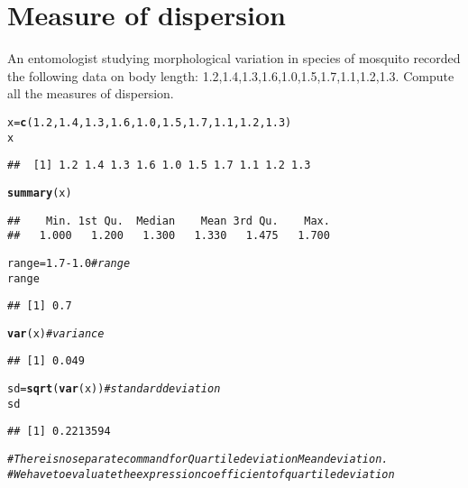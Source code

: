 \documentclass{article}\usepackage[]{graphicx}\usepackage[]{xcolor}
\makeatletter
\newcommand{\hlnum}[1]{\textcolor[rgb]{0.686,0.059,0.569}{#1}}%
\newcommand{\hlcom}[1]{\textcolor[rgb]{0.678,0.584,0.686}{\textit{#1}}}%
\newcommand{\hlopt}[1]{\textcolor[rgb]{0,0,0}{#1}}%
\newcommand{\hldef}[1]{\textcolor[rgb]{0.345,0.345,0.345}{#1}}%
\newcommand{\hlkwb}[1]{\textcolor[rgb]{0.69,0.353,0.396}{#1}}%
\newcommand{\hlkwd}[1]{\textcolor[rgb]{0.737,0.353,0.396}{\textbf{#1}}}%
\newenvironment{kframe}{%
 \def\at@end@of@kframe{}%
 \ifinner\ifhmode%
  \def\at@end@of@kframe{\end{minipage}}%
  \begin{minipage}{\columnwidth}%
 \fi\fi%
 \def\FrameCommand##1{\hskip\@totalleftmargin \hskip-\fboxsep
 \colorbox{shadecolor}{##1}\hskip-\fboxsep
     \hskip-\linewidth \hskip-\@totalleftmargin \hskip\columnwidth}%
 \MakeFramed {\advance\hsize-\width
   \@totalleftmargin\z@ \linewidth\hsize
   \@setminipage}}%
 {\par\unskip\endMakeFramed%
 \at@end@of@kframe}
\newenvironment{knitrout}{}{} %
\makeatother
\begin{document}
\section{Measure of dispersion}

An entomologist studying morphological variation in species of mosquito
recorded the following data on body length:
1.2,1.4,1.3,1.6,1.0,1.5,1.7,1.1,1.2,1.3.
Compute all the measures of dispersion.
\begin{knitrout}
\color{fgcolor}\begin{kframe}
\begin{alltt}
\hldef{x}\hlkwb{=}\hlkwd{c}\hldef{(}\hlnum{1.2}\hldef{,}\hlnum{1.4}\hldef{,}\hlnum{1.3}\hldef{,}\hlnum{1.6}\hldef{,}\hlnum{1.0}\hldef{,}\hlnum{1.5}\hldef{,}\hlnum{1.7}\hldef{,}\hlnum{1.1}\hldef{,}\hlnum{1.2}\hldef{,}\hlnum{1.3}\hldef{)}
\hldef{x}
\end{alltt}
\begin{verbatim}
##  [1] 1.2 1.4 1.3 1.6 1.0 1.5 1.7 1.1 1.2 1.3
\end{verbatim}
\begin{alltt}
\hlkwd{summary}\hldef{(x)}
\end{alltt}
\begin{verbatim}
##    Min. 1st Qu.  Median    Mean 3rd Qu.    Max. 
##   1.000   1.200   1.300   1.330   1.475   1.700
\end{verbatim}
\begin{alltt}
\hldef{range}\hlkwb{=}\hlnum{1.7}\hlopt{-}\hlnum{1.0} \hlcom{#range}
\hldef{range}
\end{alltt}
\begin{verbatim}
## [1] 0.7
\end{verbatim}
\begin{alltt}
\hlkwd{var}\hldef{(x)} \hlcom{#variance}
\end{alltt}
\begin{verbatim}
## [1] 0.049
\end{verbatim}
\begin{alltt}
\hldef{sd}\hlkwb{=}\hlkwd{sqrt}\hldef{(}\hlkwd{var}\hldef{(x))} \hlcom{#standard deviation}
\hldef{sd}
\end{alltt}
\begin{verbatim}
## [1] 0.2213594
\end{verbatim}
\begin{alltt}
\hlcom{# There is no separate command for Quartile deviation Mean deviation.}
\hlcom{# We have to evaluate the expression coefficient of quartile deviation}

\end{alltt}
\end{kframe}
\end{knitrout}
\end{document}

